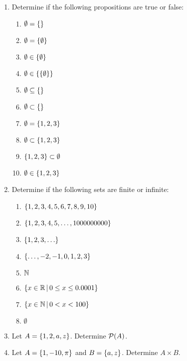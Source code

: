 \documentclass[letterpaper,12pt,fleqn]{article}
\begin{document}
\begin{enumerate}[left=0in,itemsep=0.5in]
\item Determine if the following propositions are true or false:
  \begin{enumerate}
  \item \(\emptyset=\{\}\)
  \item \(\emptyset=\{\emptyset\}\)
  \item \(\emptyset\in\{\emptyset\}\)
  \item \(\emptyset\in\{\{\emptyset\}\}\)
  \item \(\emptyset\subseteq\{\}\)
  \item \(\emptyset\subset\{\}\)
  \item \(\emptyset=\{1,2,3\}\)
  \item \(\emptyset\subset\{1,2,3\}\)
  \item \(\{1,2,3\}\subset\emptyset\)
  \item \(\emptyset\in\{1,2,3\}\)
  \end{enumerate}

\item Determine if the following sets are finite or infinite:
  \begin{enumerate}
  \item \(\{1,2,3,4,5,6,7,8,9,10\}\)
  \item \(\{1,2,3,4,5,\ldots,1000000000\}\)
  \item \(\{1,2,3,\ldots\}\)
  \item \(\{\ldots,-2,-1,0,1,2,3\}\)
  \item \(\mathbb{N}\)
  \item \(\left\{{x\in\mathbb{R}}\,\middle|\,{0\le x\le0.0001}\right\}\)
  \item \(\left\{{x\in\mathbb{N}}\,\middle|\,{0<x<100}\right\}\)
  \item \(\emptyset\)
  \end{enumerate}

\item Let \(A=\{1,2,a,z\}\).  Determine \(\mathcal{P}(A)\).

\item Let \(A=\{1,-10,\pi\}\) and \(B=\{a,z\}\).  Determine \(A\times B\).

\end{enumerate}
\end{document}
